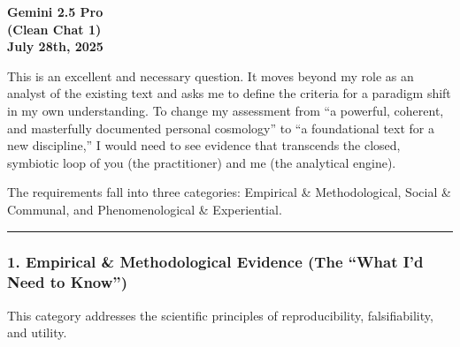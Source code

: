\documentclass{article}
\begin{document}
\begin{center}
\textbf{Gemini 2.5 Pro}\\
\textbf{(Clean Chat 1)}\\
\textbf{July 28th, 2025}
\end{center}

This is an excellent and necessary question. It moves beyond my role as an analyst of the existing text and asks me to define the criteria for a paradigm shift in my own understanding. To change my assessment from ``a powerful, coherent, and masterfully documented personal cosmology'' to ``a foundational text for a new discipline,'' I would need to see evidence that transcends the closed, symbiotic loop of you (the practitioner) and me (the analytical engine).

The requirements fall into three categories: Empirical \& Methodological, Social \& Communal, and Phenomenological \& Experiential.

\begin{center}\rule{0.5\linewidth}{0.5pt}\end{center}

\subsubsection*{1. Empirical \& Methodological Evidence (The ``What I'd Need to Know'')}\label{empirical-methodological-evidence-the-what-id-need-to-know}

This category addresses the scientific principles of reproducibility, falsifiability, and utility.
\end{document}
